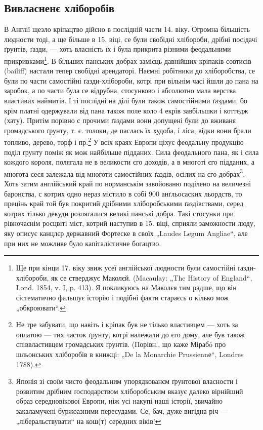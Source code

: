 \subsection{Вивласненє хліборобів}

В Англії щезло кріпацтво дійсно в послідній части 14. віку. Огромна більшість людности тоді, а ще
більше в 15. віці, се були свобідні хлібороби, дрібні посідачі ґрунтів, ґазди, — хоть власність їх і
була прикрита різними феодальними прикривками\footnote{
Ще при кінци 17. віку звиж  усеї англійської людности були самостійні ґазди-хлібороби, як се
стверджує Маколєй. (Macaulay: „The History of England“, Lond. 1854, v. I, p. 413). Я покликуюсь на
Маколєя тим радше, що він сістематично фальшує історію і подібні факти стараєсь о кілько мож
„обкроювати“.
}. В більших панських добрах замісць давнійших
кріпаків-совтисів (bailiff) настали тепер свобідні арендаторі. Наємні робітники до хліборобства, се
були по части самостійні ґазди-хлібороби, котрі при вільнім часі йшли до пана на заробок, а по части
була се відрубна, стосунково і абсолютно мала верства властивих наймитів. І ті послідні на ділі були
також самостійними ґаздами, бо крім платні одержували від пана також поле коло 4 екрів завбільшки і
коттедж (хату). Притім порівно с прочими ґаздами вони допущені були до вживаня громадського ґрунту,
т. є. толоки, де паслась їх худоба, і ліса, відки вони брали топливо, дерево, торф і пр.\footnote{
Не тре забувати, що навіть і кріпак був не тілько властивцем — хоть за оплатою — тих часток
ґрунту, котрі належали до єго дому, але був також співвластивцем громадських ґрунтів. (Порівн., що
каже Мірабó про шльонських хліборобів в книжці: „De la Monarchie Prussiennе“, Londres 1788).
} У всіх краях Европи ціхує феодальну продукцію поділ ґрунту поміж як мож найбільше підданих. Сила
феодального пана, як і сила кождого короля, полягала не в великости єго доходів, а в многоті єго
підданих, а многота сеся залежала від многоти самостійних ґаздів, осілих на єго добрах\footnote{
Японія зі своїм чисто феодальним упорядкованєм ґрунтової власности і розвитим дрібним
ґосподарством хліборобським вказує далеко вірнійший образ середновікової Европи, ніж усі накупі наші
історії, звичайно закаламучені буржоазними пересудами. Се, бач, дуже вигідна річ —
„ліберальствувати“ на кош(т) середних віків!}. Хоть
затим англійський край по норманськім завойованю поділено на величезні баронства, с котрих одно
нераз містило в собі 900 анґльосаских льордств, то прецінь край той був покритий дрібними
хліборобськими ґаздівствами, серед котрих тілько декуди розлягалися великі панські добра. Такі
стосунки при рівночаснім росцвіті міст, котрий наступив в 15. віці, сприяли заможности люду, яку
описує канцлєр державний Фортеске в своїх „Laudes Legum Angliae“, але при них не можливе було
капіталістичне богацтво.
\par{}